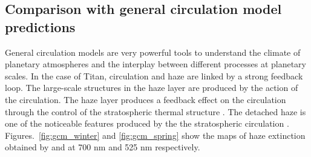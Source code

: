 \subsection{Comparison with general circulation model predictions}

General circulation models are very powerful tools to understand the climate of planetary atmospheres and the
interplay between different processes at planetary scales. In the case of Titan, circulation and haze are linked
by a strong feedback loop. The large-scale structures in the haze layer are produced by the action of the
circulation. The haze layer produces a feedback effect on the circulation through the control of the stratospheric
thermal structure \citep{Rannou2004}. The detached haze is one of the noticeable features produced by the the
stratospheric circulation \citep{Rannou2002, Lebonnois2012, Larson2015}. Figures.~\ref{fig:gcm_winter}
and \ref{fig:gcm_spring} show the maps of haze extinction obtained by \cite{Lebonnois2012} and
\cite{Larson2015} at 700 nm and 525 nm respectively.

\begin{figure*}[!ht]
\caption{Zonally-averaged haze extinction at northern winter solstice
($L_s = \ang{270}$) estimated by \cite{Lebonnois2012} at the wavelength $\lambda = $ 700 nm 
and by \cite{Larson2015} at $\lambda = $ 525 nm .  Haze extinction map
retrieved from Cassini/ISS observation CL1-UV3 ($\lambda = $ 338 nm) in the middle of winter
(N1477222048\_2 - $L_s = \ang{300}$).}
\label{fig:gcm_winter}
\end{figure*}

